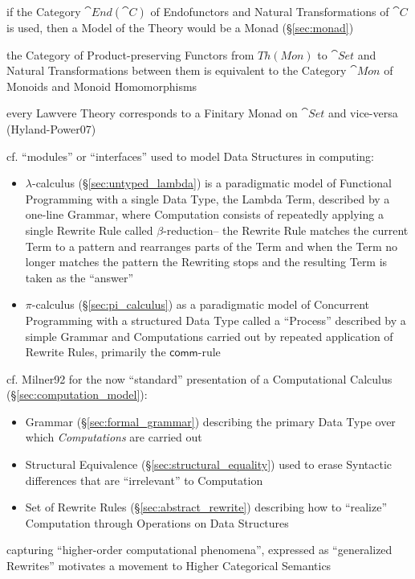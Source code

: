 if the Category $\cat{End}(\cat{C})$ of Endofunctors and Natural Transformations
of $\cat{C}$ is used, then a Model of the Theory would be a Monad
(\S\ref{sec:monad})

the Category of Product-preserving Functors from $Th(Mon)$ to $\cat{Set}$ and
Natural Transformations between them is equivalent to the Category $\cat{Mon}$
of Monoids and Monoid Homomorphisms

every Lawvere Theory corresponds to a Finitary Monad on $\cat{Set}$ and
vice-versa (Hyland-Power07)

cf. ``modules'' or ``interfaces'' used to model Data Structures in computing:
\begin{itemize}
\item $\lambda$-calculus (\S\ref{sec:untyped_lambda}) is a paradigmatic model of
  Functional Programming with a single Data Type, the Lambda Term, described by
  a one-line Grammar, where Computation consists of repeatedly applying a single
  Rewrite Rule called $\beta$-reduction-- the Rewrite Rule matches the current
  Term to a pattern and rearranges parts of the Term and when the Term no longer
  matches the pattern the Rewriting stops and the resulting Term is taken as the
  ``answer''
\item $\pi$-calculus (\S\ref{sec:pi_calculus}) as a paradigmatic model of
  Concurrent Programming with a structured Data Type called a ``Process''
  described by a simple Grammar and Computations carried out by repeated
  application of Rewrite Rules, primarily the $\mathsf{comm}$-rule
\end{itemize}

cf. Milner92 \cite{milner92} for the now ``standard'' presentation of a
Computational Calculus (\S\ref{sec:computation_model}):
\begin{itemize}
  \item Grammar (\S\ref{sec:formal_grammar}) describing the primary Data Type
    over which \emph{Computations} are carried out
  \item Structural Equivalence (\S\ref{sec:structural_equality}) used to erase
    Syntactic differences that are ``irrelevant'' to Computation
  \item Set of Rewrite Rules (\S\ref{sec:abstract_rewrite}) describing how to
    ``realize'' Computation through Operations on Data Structures
\end{itemize}

capturing ``higher-order computational phenomena'', expressed as ``generalized
Rewrites'' motivates a movement to Higher Categorical Semantics

